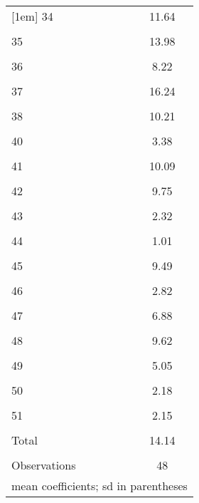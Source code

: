 \begin{table}[H]
\begin{tabular}{l*{1}{c}}
[1em]
34                  &       11.64\\
                    &            \\
[1em]
35                  &       13.98\\
                    &            \\
[1em]
36                  &        8.22\\
                    &            \\
[1em]
37                  &       16.24\\
                    &            \\
[1em]
38                  &       10.21\\
                    &            \\
[1em]
40                  &        3.38\\
                    &            \\
[1em]
41                  &       10.09\\
                    &            \\
[1em]
42                  &        9.75\\
                    &            \\
[1em]
43                  &        2.32\\
                    &            \\
[1em]
44                  &        1.01\\
                    &            \\
[1em]
45                  &        9.49\\
                    &            \\
[1em]
46                  &        2.82\\
                    &            \\
[1em]
47                  &        6.88\\
                    &            \\
[1em]
48                  &        9.62\\
                    &            \\
[1em]
49                  &        5.05\\
                    &            \\
[1em]
50                  &        2.18\\
                    &            \\
[1em]
51                  &        2.15\\
                    &            \\
[1em]
Total               &       14.14\\
                    &            \\
\hline
Observations        &          48\\
\hline\hline
\multicolumn{2}{l}{\footnotesize mean coefficients; sd in parentheses}\\
\end{tabular}
\end{table}
